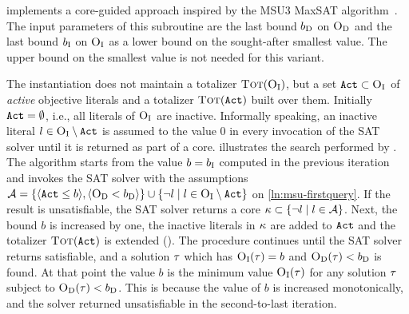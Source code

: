 \msu{} implements a core-guided approach inspired by the MSU3 MaxSAT algorithm~\autocites{DBLP:journals/corr/abs-0712-1097}.
The input parameters of this subroutine are the last bound $b_{\text{D}}$ on $\textsc{O}_{\text{D}}$ and the last bound $b_{\text{I}}$ on $\textsc{O}_{\text{I}}$ as a lower bound on the sought-after smallest value.
The upper bound on the smallest value is not needed for this variant.

The \msu{} instantiation does not maintain a totalizer $\textsc{Tot}(\textsc{O}_{\text{I}})$, but a set $\texttt{Act} \subset \textsc{O}_{\text{I}}$ of \emph{active} objective literals and a totalizer $\textsc{Tot}(\texttt{Act})$ built over them. 
Initially $\texttt{Act} = \emptyset$, i.e., all literals of $\textsc{O}_{\text{I}}$ are inactive.
Informally speaking, an inactive literal $l \in \textsc{O}_{\text{I}} \setminus \texttt{Act}$ is assumed to the value $0$ in every invocation of the SAT solver until it is returned as part of a core.
 illustrates the search performed by \msu{}.
The algorithm starts from the value $b=b_{\text{I}}$ computed in the previous iteration and invokes the SAT solver with the assumptions $\mathcal{A} = \{\langle \texttt{Act} \leq b \rangle, \langle \textsc{O}_{\text{D}} < b_{\text{D}} \rangle  \} \cup \{ \lnot l \mid l \in \textsc{O}_{\text{I}} \setminus \texttt{Act}\}$ on \cref{ln:msu-firstquery}.
If the result is unsatisfiable, the SAT solver returns a core $\kappa \subset \{\lnot l \mid l \in \mathcal{A}\}$.
Next, the bound $b$ is increased by one, the inactive literals in $\kappa$ are added to $\texttt{Act}$ and the totalizer $\textsc{Tot}(\texttt{Act})$ is extended ().
The procedure continues until the SAT solver returns satisfiable, and a solution $\tau$ which has $\textsc{O}_{\text{I}}(\tau) = b$ and $\textsc{O}_{\text{D}}(\tau) < b_{\text{D}}$ is found.
At that point the value $b$ is the minimum value $\textsc{O}_{\text{I}}(\tau)$ for any solution $\tau$ subject to $\textsc{O}_{\text{D}}(\tau) < b_{\text{D}}$.
This is because the value of $b$ is increased monotonically, and the solver returned unsatisfiable in the second-to-last iteration. 

